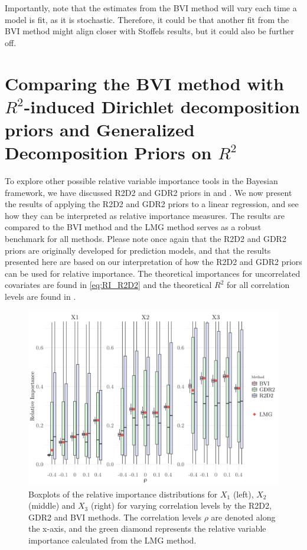 \noindent Importantly, note that the estimates from the BVI method will vary each time a model is fit, as it is stochastic. Therefore, it could be that another fit from the BVI method might align closer with Stoffels results, but it could also be further off. 

\section{Comparing the BVI method with $R^2$-induced Dirichlet decomposition priors and Generalized Decomposition Priors on $R^2$}
To explore other possible relative variable importance tools in the Bayesian framework, we have discussed R2D2 and GDR2 priors in  and . We now present the results of applying the R2D2 and GDR2 priors to a linear regression, and see how they can be interpreted as relative importance measures. The results are compared to the BVI method and the LMG method serves as a robust benchmark for all methods. Please note once again that the R2D2 and GDR2 priors are originally developed for prediction models, and that the results presented here are based on our interpretation of how the R2D2 and GDR2 priors can be used for relative importance. The theoretical importances for uncorrelated covariates are found in \eqref{eq:RI_R2D2} and the theoretical $R^2$ for all correlation levels are found in . 
\begin{figure}[H]%
  \centering
  \includegraphics[width=1\linewidth]{Figures/R2D2_BVI_Comparison/R2D2_BVI_boxplot.png}
  \caption[Comparison of the relative importance from the BVI method and the shrinkage prior methods]{Boxplots of the relative importance distributions for $X_1$ (left), $X_2$ (middle) and $X_3$ (right) for varying correlation levels by the R2D2, GDR2 and BVI methods. The correlation levels $\rho$ are denoted along the x-axis, and the green diamond represents the relative variable importance calculated from the LMG method.}
  \label{fig:r2d2_importance}
\end{figure}
